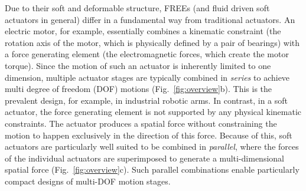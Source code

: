 Due to their soft and deformable structure, FREEs (and fluid driven soft actuators in general) differ in a fundamental way from traditional actuators.
An electric motor, for example, essentially combines a kinematic constraint (the rotation axis of the motor, which is physically defined by a pair of bearings) with a force generating element (the electromagnetic forces, which create the motor torque).
Since the motion of such an actuator is inherently limited to one dimension, multiple actuator stages are typically combined in \emph{series} to achieve multi degree of freedom (DOF) motions (Fig.~\ref{fig:overview}b). 
This is the prevalent design, for example, in industrial robotic arms.
In contrast, in a soft actuator, the force generating element is not supported by any physical kinematic constraints.
The actuator produces a spatial force without constraining the motion to happen exclusively in the direction of this force.
Because of this, soft actuators are particularly well suited to be combined in \emph{parallel}, where the forces of the individual actuators are superimposed to generate a multi-dimensional spatial force (Fig.~\ref{fig:overview}c).
Such parallel combinations enable particularly compact designs of multi-DOF motion stages.




